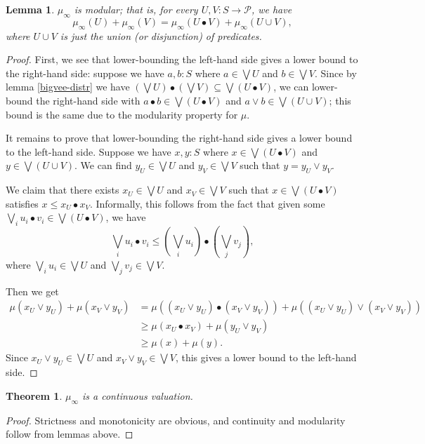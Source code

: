 \documentclass{article}           %
\newtheorem{lemma}{Lemma}
\newtheorem{theorem}{Theorem}
\newcommand{\Prop}{\mathcal{P}}
\begin{document}
\begin{lemma}
$\mu_\infty$ is modular; that is, for every $U, V : S \to \Prop$, we have
\[
\mu_\infty(U) + \mu_\infty(V) = \mu_\infty(U \bullet V) + \mu_\infty(U \cup V),
\]
where $U \cup V$ is just the union (or disjunction) of predicates.
\end{lemma}
\begin{proof}
First, we see that lower-bounding the left-hand side gives a lower bound to the right-hand side: suppose we have $a, b : S$ where $a \in \bigvee U$ and $b \in \bigvee V$. Since by lemma \ref{bigvee-distr} we have $(\bigvee U) \bullet (\bigvee V) \subseteq \bigvee (U \bullet V)$, we can lower-bound the right-hand side with $a \bullet b \in \bigvee (U \bullet V)$ and $a \vee b \in \bigvee (U \cup V)$; this bound is the same due to the modularity property for $\mu$.

It remains to prove that lower-bounding the right-hand side gives a lower bound to the left-hand side. Suppose we have $x, y : S$ where $x \in \bigvee (U \bullet V)$ and $y \in \bigvee (U \cup V)$. We can find $y_U \in \bigvee U$ and $y_V \in \bigvee V$ such that $y = y_U \vee y_V$.

We claim that there exists $x_U \in \bigvee U$ and $x_V \in \bigvee V$ such that $x \in \bigvee (U \bullet V)$ satisfies $x \le x_U \bullet x_V$. Informally, this follows from the fact that given some $\bigvee_i u_i \bullet v_i \in \bigvee (U \bullet V)$, we have 
\[
\bigvee_i u_i \bullet v_i \le \left( \bigvee_i u_i \right) \bullet \left( \bigvee_j v_j \right),
\]
where $\bigvee_i u_i \in \bigvee U$ and $\bigvee_j v_j \in \bigvee V$.

Then we get
\begin{align*}
\mu(x_U \vee y_U) + \mu(x_V \vee y_V)
  &= \mu((x_U \vee y_U) \bullet (x_V \vee y_V)) + \mu((x_U \vee y_U) \vee (x_V \vee y_V))
  \tag{modular}
  \\ &\ge \mu(x_U \bullet x_V) + \mu(y_U \vee y_V)
  \\ &\ge \mu(x) + \mu(y). \tag{monotone}
\end{align*}
Since $x_U \vee y_U \in \bigvee U$ and $x_V \vee y_V \in \bigvee V$, this gives a lower bound to the left-hand side.
\end{proof}

\begin{theorem}
$\mu_\infty$ is a continuous valuation.
\end{theorem}
 
\begin{proof}
Strictness and monotonicity are obvious, and continuity and modularity follow from lemmas above.
\end{proof}
\end{document}
